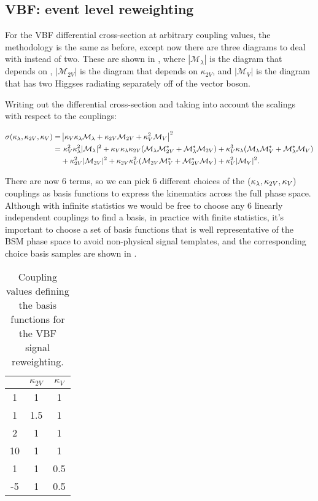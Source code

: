 \subsection{VBF: event level reweighting}
\label{subsec:ggF-sig-rw}

For the VBF differential cross-section at arbitrary coupling values, the methodology is the same as before, except now there are three diagrams to deal with instead of two. These are shown in \Fig{\ref{fig:VBF_feyn_dias}}, where $|\mathcal{M}_\lambda|$ is the diagram that depends on \kl, $|\mathcal{M}_{2V}|$ is the diagram that depends on $\kappa_{2V}$, and $|\mathcal{M}_{V}|$ is the diagram that has two Higgses radiating separately off of the vector boson.

\def\kvv{\kappa_{2V}}
\def\kv{\kappa_V}

Writing out the differential cross-section and taking into account the scalings with respect to the couplings:

\begin{align}
\sigma(\klm, \kvv, \kv) = &\left| \kv \klm \mathcal{M}_\lambda + \kvv \mathcal{M}_{2V} + \kappa_V^2 \mathcal{M}_V \right|^2 \\
 = & \ \kv^2 \klm^2 | \mathcal{M}_\lambda |^2
 + \kv \klm \kvv ( \mathcal{M}_\lambda \mathcal{M}_{2V}^* + \mathcal{M}_\lambda^* \mathcal{M}_{2V}  )
 + \kv^3  \klm  ( \mathcal{M}_\lambda \mathcal{M}_V^* + \mathcal{M}_\lambda^* \mathcal{M}_V ) \notag \\
 &+ \kvv^2 | \mathcal{M}_{2V} |^2 
 + \kvv \kv^2 ( \mathcal{M}_{2V} \mathcal{M}_V^* + \mathcal{M}_{2V}^* \mathcal{M}_V )
 + \kv^2  |\mathcal{M}_V |^2 . \notag
 \end{align}
 
There are now 6 terms, so we can pick 6 different choices of the $(\klm, \kvv, \kv) $ couplings as basis functions to express the kinematics across the full phase space.
Although with infinite statistics we would be free to choose any 6 linearly independent couplings to find a basis, in practice with finite statistics, it's important to choose a set of basis functions that is well representative of the BSM phase space to avoid non-physical signal templates, and the corresponding choice basis samples are shown in \Tab{\ref{tab:vbf-sig-rw-basis}}.

\begin{table}[htbp]
	\centering
	\begin{tabular}{ c | c | c  }
	{\bfseries \kl} & {\bfseries $\kvv$} & {\bfseries $\kv$} \\
	\hline
	1 & 1 & 1 \\
	1 & 1.5 & 1 \\
	2 & 1 & 1 \\
	10 & 1 & 1 \\
	1 & 1 & 0.5 \\
	-5 & 1 & 0.5 
	\end{tabular}
	\caption{Coupling values defining the basis functions for the VBF signal reweighting.}
	\label{tab:vbf-sig-rw-basis}
\end{table}

